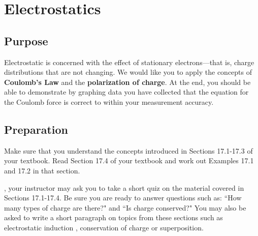 
\chapter{Electrostatics}

\section{Purpose}
Electrostatic is concerned with the effect of stationary electrons---that is, charge distributions that are not changing.  We would like you to apply the concepts of \textbf{Coulomb's Law}%
 and the \textbf{polarization of charge}.  At the end, you should be able to demonstrate by graphing data you have collected that the equation for the Coulomb force is correct to within your measurement accuracy.	
		
\section{Preparation}
Make sure that you understand the concepts introduced in Sections 17.1-17.3 of your textbook.  Read Section 17.4 of your textbook and work out Examples 17.1 and 17.2 in that section.  

, your instructor may ask you to take a short quiz on the material covered in Sections 17.1-17.4.  Be sure you are ready to answer questions such as: ``How many types of charge are there?" and ``Is charge conserved?"  You may also be asked to write a short paragraph on topics from these sections such as electrostatic induction
, conservation of charge
or superposition.
